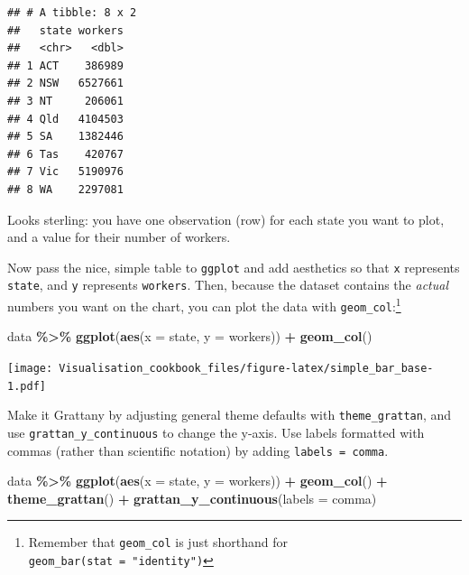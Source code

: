 \documentclass[
]{book}
\newenvironment{Shaded}{\begin{snugshade}}{\end{snugshade}}
\newcommand{\DataTypeTok}[1]{\textcolor[rgb]{0.13,0.29,0.53}{#1}}
\newcommand{\KeywordTok}[1]{\textcolor[rgb]{0.13,0.29,0.53}{\textbf{#1}}}
\newcommand{\NormalTok}[1]{#1}
\newcommand{\OperatorTok}[1]{\textcolor[rgb]{0.81,0.36,0.00}{\textbf{#1}}}
\newcommand{\StringTok}[1]{\textcolor[rgb]{0.31,0.60,0.02}{#1}}
\begin{document}
\begin{verbatim}
## # A tibble: 8 x 2
##   state workers
##   <chr>   <dbl>
## 1 ACT    386989
## 2 NSW   6527661
## 3 NT     206061
## 4 Qld   4104503
## 5 SA    1382446
## 6 Tas    420767
## 7 Vic   5190976
## 8 WA    2297081
\end{verbatim}

Looks sterling: you have one observation (row) for each state you want to plot, and a value for their number of workers.

Now pass the nice, simple table to \texttt{ggplot} and add aesthetics so that \texttt{x} represents \texttt{state}, and \texttt{y} represents \texttt{workers}. Then, because the dataset contains the \emph{actual} numbers you want on the chart, you can plot the data with \texttt{geom\_col}:\footnote{Remember that \texttt{geom\_col} is just shorthand for \texttt{geom\_bar(stat\ =\ "identity")}}

\begin{Shaded}
\begin{Highlighting}[]
\NormalTok{data }\OperatorTok{\%\textgreater{}\%}\StringTok{ }
\StringTok{  }\KeywordTok{ggplot}\NormalTok{(}\KeywordTok{aes}\NormalTok{(}\DataTypeTok{x =}\NormalTok{ state,}
             \DataTypeTok{y =}\NormalTok{ workers)) }\OperatorTok{+}\StringTok{ }
\StringTok{  }\KeywordTok{geom\_col}\NormalTok{()}
\end{Highlighting}
\end{Shaded}

\texttt{[image: Visualisation\_cookbook\_files/figure-latex/simple\_bar\_base-1.pdf]}

Make it Grattany by adjusting general theme defaults with \texttt{theme\_grattan}, and use \texttt{grattan\_y\_continuous} to change the y-axis. Use labels formatted with commas (rather than scientific notation) by adding \texttt{labels\ =\ comma}.

\begin{Shaded}
\begin{Highlighting}[]
\NormalTok{data }\OperatorTok{\%\textgreater{}\%}\StringTok{ }
\StringTok{  }\KeywordTok{ggplot}\NormalTok{(}\KeywordTok{aes}\NormalTok{(}\DataTypeTok{x =}\NormalTok{ state,}
             \DataTypeTok{y =}\NormalTok{ workers)) }\OperatorTok{+}\StringTok{ }
\StringTok{  }\KeywordTok{geom\_col}\NormalTok{() }\OperatorTok{+}\StringTok{ }
\StringTok{  }\KeywordTok{theme\_grattan}\NormalTok{() }\OperatorTok{+}\StringTok{ }
\StringTok{  }\KeywordTok{grattan\_y\_continuous}\NormalTok{(}\DataTypeTok{labels =}\NormalTok{ comma)}
\end{Highlighting}
\end{Shaded}
\end{document}

